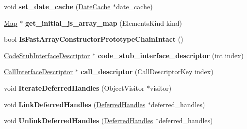 \begin{DoxyCompactItemize}
\item 
\hypertarget{classv8_1_1internal_1_1_isolate_a5aec58506808233f8f65f93d2959c5c6}{}void {\bfseries set\+\_\+date\+\_\+cache} (\hyperlink{classv8_1_1internal_1_1_date_cache}{Date\+Cache} $\ast$date\+\_\+cache)\label{classv8_1_1internal_1_1_isolate_a5aec58506808233f8f65f93d2959c5c6}

\item 
\hypertarget{classv8_1_1internal_1_1_isolate_af9d6a949cc6b4229b2046b53e472f10b}{}\hyperlink{classv8_1_1internal_1_1_map}{Map} $\ast$ {\bfseries get\+\_\+initial\+\_\+js\+\_\+array\+\_\+map} (Elements\+Kind kind)\label{classv8_1_1internal_1_1_isolate_af9d6a949cc6b4229b2046b53e472f10b}

\item 
\hypertarget{classv8_1_1internal_1_1_isolate_aead07811eb80fcfa9d3ab7deb4cdf2b2}{}bool {\bfseries Is\+Fast\+Array\+Constructor\+Prototype\+Chain\+Intact} ()\label{classv8_1_1internal_1_1_isolate_aead07811eb80fcfa9d3ab7deb4cdf2b2}

\item 
\hypertarget{classv8_1_1internal_1_1_isolate_a2a2da7f9101e2894d770d5bb7032eb2f}{}\hyperlink{classv8_1_1internal_1_1_code_stub_interface_descriptor}{Code\+Stub\+Interface\+Descriptor} $\ast$ {\bfseries code\+\_\+stub\+\_\+interface\+\_\+descriptor} (int index)\label{classv8_1_1internal_1_1_isolate_a2a2da7f9101e2894d770d5bb7032eb2f}

\item 
\hypertarget{classv8_1_1internal_1_1_isolate_a8823343a3e718a3e51c7c728a0384b65}{}\hyperlink{classv8_1_1internal_1_1_call_interface_descriptor}{Call\+Interface\+Descriptor} $\ast$ {\bfseries call\+\_\+descriptor} (Call\+Descriptor\+Key index)\label{classv8_1_1internal_1_1_isolate_a8823343a3e718a3e51c7c728a0384b65}

\item 
\hypertarget{classv8_1_1internal_1_1_isolate_a9bc0edc0ab832fc31e9383321cd83233}{}void {\bfseries Iterate\+Deferred\+Handles} (Object\+Visitor $\ast$visitor)\label{classv8_1_1internal_1_1_isolate_a9bc0edc0ab832fc31e9383321cd83233}

\item 
\hypertarget{classv8_1_1internal_1_1_isolate_ad40a0a2361ce9d4f44de9fbf9b7c9130}{}void {\bfseries Link\+Deferred\+Handles} (\hyperlink{classv8_1_1internal_1_1_deferred_handles}{Deferred\+Handles} $\ast$deferred\+\_\+handles)\label{classv8_1_1internal_1_1_isolate_ad40a0a2361ce9d4f44de9fbf9b7c9130}

\item 
\hypertarget{classv8_1_1internal_1_1_isolate_a07a4e40eb803a30794e372aca7f0ff11}{}void {\bfseries Unlink\+Deferred\+Handles} (\hyperlink{classv8_1_1internal_1_1_deferred_handles}{Deferred\+Handles} $\ast$deferred\+\_\+handles)\label{classv8_1_1internal_1_1_isolate_a07a4e40eb803a30794e372aca7f0ff11}


\end{DoxyCompactItemize}
